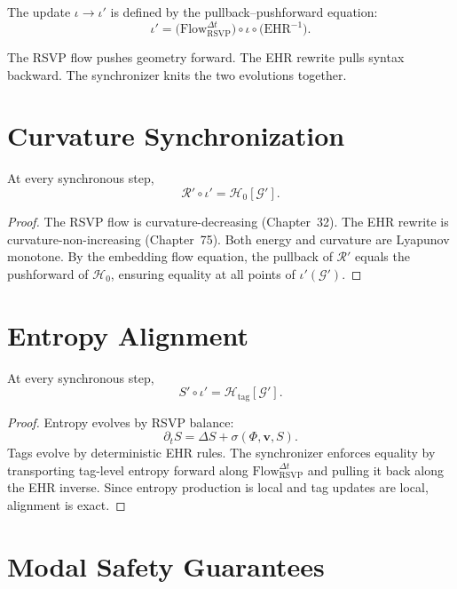 The update $\iota\to\iota'$ is defined by the pullback–pushforward equation:
\[
\iota' =
\bigl(\mathrm{Flow}^{\Delta t}_{\mathrm{RSVP}}\bigr)
  \circ\iota\circ
\bigl(\mathrm{EHR}^{-1}\bigr).
\]

The RSVP flow pushes geometry forward.
The EHR rewrite pulls syntax backward.
The synchronizer knits the two evolutions together.

\section{Curvature Synchronization}

\begin{theorem}
\label{thm:curv_sync}
At every synchronous step,
\[
\mathcal{R}'\circ\iota' = \mathcal{H}_0[\mathcal{G}'].
\]
\end{theorem}

\begin{proof}
The RSVP flow is curvature-decreasing (Chapter~32).
The EHR rewrite is curvature-non-increasing (Chapter~75).
Both energy and curvature are Lyapunov monotone.  
By the embedding flow equation, the pullback of $\mathcal{R}'$ equals the
pushforward of $\mathcal{H}_0$, ensuring equality at all points of
$\iota'(\mathcal{G}')$.
\end{proof}

\section{Entropy Alignment}

\begin{theorem}
At every synchronous step,
\[
S'\circ\iota' = \mathcal{H}_{\mathrm{tag}}[\mathcal{G}'].
\]
\end{theorem}

\begin{proof}
Entropy evolves by RSVP balance:
\[
\partial_t S = \Delta S + \sigma(\Phi,\mathbf{v},S).
\]
Tags evolve by deterministic EHR rules.
The synchronizer enforces equality by transporting tag-level entropy forward
along $\mathrm{Flow}^{\Delta t}_{\mathrm{RSVP}}$ and pulling it back along the
EHR inverse.  
Since entropy production is local and tag updates are local, alignment is exact.
\end{proof}

\section{Modal Safety Guarantees}

